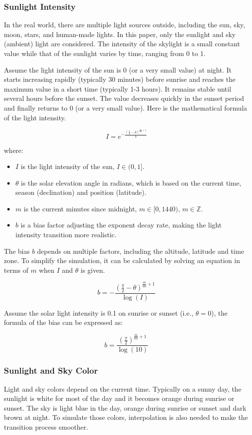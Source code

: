 \documentclass{article}
\begin{document}
\subsubsection {Sunlight Intensity}
In the real world, there are multiple light sources outside, including the sun, sky, moon, stars, 
and human-made lights. In this paper, only the sunlight and sky (ambient) light are considered. 
The intensity of the skylight is a small constant value while that of the sunlight varies by 
time, ranging from 0 to 1.

Assume the light intensity of the sun is 0 (or a very small value) at night. It starts increasing 
rapidly (typically 30 minutes) before sunrise and reaches the maximum value in a short time 
(typically 1-3 hours). It remains stable until several hours before the sunset. The value 
decreases quickly in the sunset period and finally returns to 0 (or a very small value). Here is 
the mathematical formula of the light intensity.

\[
  I = e^{-\frac{\left(\frac{\pi}{2} - \theta\right)^{\frac{m}{60} + 1}}{b}}
\]

where:
\begin{itemize}
  \item \( I \) is the light intensity of the sun, \( I \in (0, 1] \).
  \item \( \theta \) is the solar elevation angle in radians, which is based on the current time, 
  season (declination) and position (latitude).
  \item \( m \) is the current minutes since midnight, \( m \in [0, 1440) \), \( m \in \mathbb{Z} \).
  \item \( b \) is a bias factor adjusting the exponent decay rate, making the light intensity
  transition more realistic.
\end{itemize}

The bias \( b \) depends on multiple factors, including the altitude, latitude and time zone. To
simplify the simulation, it can be calculated by solving an equation in terms of \( m \) when 
\( I \) and \( \theta\) is given.

\[
  b = -\frac{\left(\frac{\pi}{2} - \theta\right)^{\frac{m}{60} + 1}}{\log(I)}
\]

Assume the solar light intensity is 0.1 on sunrise or sunset (i.e., \( \theta=0\)), the formula 
of the bias can be expressed as:

\[
  b = \frac{\left(\frac{\pi}{2}\right)^{\frac{m}{60} + 1}}{\log(10)}
\]

\subsubsection {Sunlight and Sky Color}
Light and sky colors depend on the current time. Typically on a sunny day, the sunlight is white
for most of the day and it becomes orange during sunrise or sunset. The sky is light blue
in the day, orange during sunrise or sunset and dark brown at night. To simulate those colors, 
interpolation is also needed to make the transition process smoother. 
\end{document}
